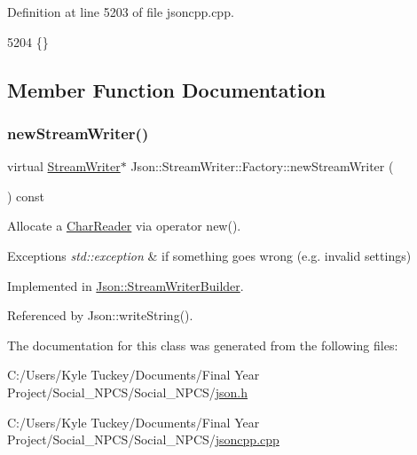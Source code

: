 Definition at line 5203 of file jsoncpp.\+cpp.


\begin{DoxyCode}
5204 \{\}
\end{DoxyCode}


\subsection{Member Function Documentation}
\mbox{\label{class_json_1_1_stream_writer_1_1_factory_a9d30ec53e8288cd53befccf1009c5f31}} 
\subsubsection{\texorpdfstring{new\+Stream\+Writer()}{newStreamWriter()}}
{\footnotesize\ttfamily virtual \hyperlink{class_json_1_1_stream_writer}{Stream\+Writer}$\ast$ Json\+::\+Stream\+Writer\+::\+Factory\+::new\+Stream\+Writer (\begin{DoxyParamCaption}{ }\end{DoxyParamCaption}) const\hspace{0.3cm}{\ttfamily [pure virtual]}}



Allocate a \hyperlink{class_json_1_1_char_reader}{Char\+Reader} via operator new(). 


\begin{DoxyExceptions}{Exceptions}
{\em std\+::exception} & if something goes wrong (e.\+g. invalid settings) \\
\hline
\end{DoxyExceptions}


Implemented in \hyperlink{class_json_1_1_stream_writer_builder_ab9ee278609f88ae04a7c1a84e1f559e6}{Json\+::\+Stream\+Writer\+Builder}.



Referenced by Json\+::write\+String().



The documentation for this class was generated from the following files\+:\begin{DoxyCompactItemize}
\item 
C\+:/\+Users/\+Kyle Tuckey/\+Documents/\+Final Year Project/\+Social\+\_\+\+N\+P\+C\+S/\+Social\+\_\+\+N\+P\+C\+S/\hyperlink{json_8h}{json.\+h}\item 
C\+:/\+Users/\+Kyle Tuckey/\+Documents/\+Final Year Project/\+Social\+\_\+\+N\+P\+C\+S/\+Social\+\_\+\+N\+P\+C\+S/\hyperlink{jsoncpp_8cpp}{jsoncpp.\+cpp}\end{DoxyCompactItemize}
